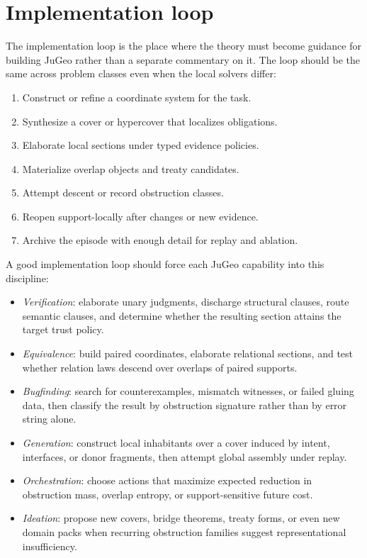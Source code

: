 \documentclass[11pt]{report}
\begin{document}
\section{Implementation loop}
The implementation loop is the place where the theory must become guidance for building JuGeo rather than a separate commentary on it. The loop should be the same across problem classes even when the local solvers differ:
\begin{enumerate}[label=\arabic*.]
\item Construct or refine a coordinate system for the task.
\item Synthesize a cover or hypercover that localizes obligations.
\item Elaborate local sections under typed evidence policies.
\item Materialize overlap objects and treaty candidates.
\item Attempt descent or record obstruction classes.
\item Reopen support-locally after changes or new evidence.
\item Archive the episode with enough detail for replay and ablation.
\end{enumerate}

A good implementation loop should force each JuGeo capability into this discipline:
\begin{itemize}
\item \emph{Verification}: elaborate unary judgments, discharge structural clauses, route semantic clauses, and determine whether the resulting section attains the target trust policy.
\item \emph{Equivalence}: build paired coordinates, elaborate relational sections, and test whether relation laws descend over overlaps of paired supports.
\item \emph{Bugfinding}: search for counterexamples, mismatch witnesses, or failed gluing data, then classify the result by obstruction signature rather than by error string alone.
\item \emph{Generation}: construct local inhabitants over a cover induced by intent, interfaces, or donor fragments, then attempt global assembly under replay.
\item \emph{Orchestration}: choose actions that maximize expected reduction in obstruction mass, overlap entropy, or support-sensitive future cost.
\item \emph{Ideation}: propose new covers, bridge theorems, treaty forms, or even new domain packs when recurring obstruction families suggest representational insufficiency.
\end{itemize}
\end{document}
